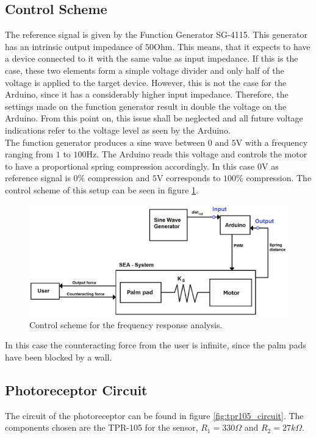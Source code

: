 	\subsection{Control Scheme}
	The reference signal is given by the Function Generator SG-4115. This generator has an intrinsic output impedance of $50$Ohm. This means, that it expects to have a device connected to it with the same value as input impedance. If this is the case, these two elements form a simple voltage divider and only half of the voltage is applied to the target device. However, this is not the case for the Arduino, since it has a considerably higher input impedance. Therefore, the settings made on the function generator result in double the voltage on the Arduino. From this point on, this issue shall be neglected and all future voltage indications refer to the voltage level as seen by the Arduino.\\
	The function generator produces a sine wave between $0$ and $5$V with a frequency ranging from $1$ to $100$Hz. The Arduino reads this voltage and controls the motor to have a proportional spring compression accordingly. In this case $0$V as reference signal is $0\%$ compression and $5$V corresponds to $100\%$ compression. The control scheme of this setup can be seen in figure \ref{fig:frf_measure_points}.
	\begin{figure}[h!]
		\centering
		\includegraphics[width=0.6\linewidth]{Figs/frf_measure_points}
		\caption{Control scheme for the frequency response analysis.}
		\label{fig:frf_measure_points}
	\end{figure}
	In this case the counteracting force from the user is infinite, since the palm pads have been blocked by a wall.
	
	\subsection{Photoreceptor Circuit}
	The circuit of the photoreceptor can be found in figure \ref{fig:tpr105_circuit}. The components chosen are the TPR-105 for the sensor, $R_1 = 330\Omega$ and $R_2 = 27k\Omega$.
	
